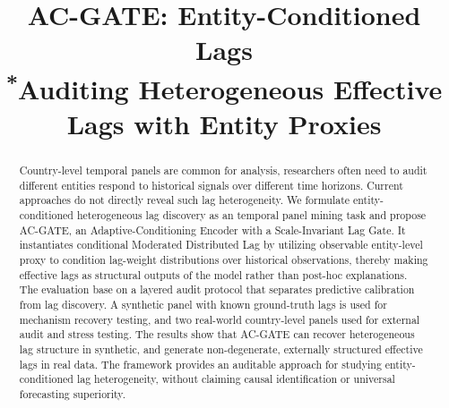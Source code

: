 \documentclass[conference]{IEEEtran}
\begin{document}
\title{AC-GATE: Entity-Conditioned Lags\\
{\footnotesize \textsuperscript{*}Auditing Heterogeneous Effective Lags with Entity Proxies}
}



\author{
\and
{}
\and
{}

}

\maketitle

\begin{abstract}
Country-level temporal panels are common for analysis, researchers often need to audit different entities respond to historical signals over different time horizons. Current approaches do not directly reveal such lag heterogeneity. We formulate entity-conditioned heterogeneous lag discovery as an temporal panel mining task and propose AC-GATE, an Adaptive-Conditioning Encoder with a Scale-Invariant Lag Gate. It instantiates conditional Moderated Distributed Lag by utilizing observable entity-level proxy to condition lag-weight distributions over historical observations, thereby making effective lags as structural outputs of the model rather than post-hoc explanations. The evaluation base on a layered audit protocol that separates predictive calibration from lag discovery. A synthetic panel with known ground-truth lags is used for mechanism recovery testing, and two real-world country-level panels used for external audit and stress testing. The results show that AC-GATE can recover heterogeneous lag structure in synthetic, and generate non-degenerate, externally structured effective lags in real data. The framework provides an auditable approach for studying entity-conditioned lag heterogeneity, without claiming causal identification or universal forecasting superiority.
\end{abstract}
\end{document}
